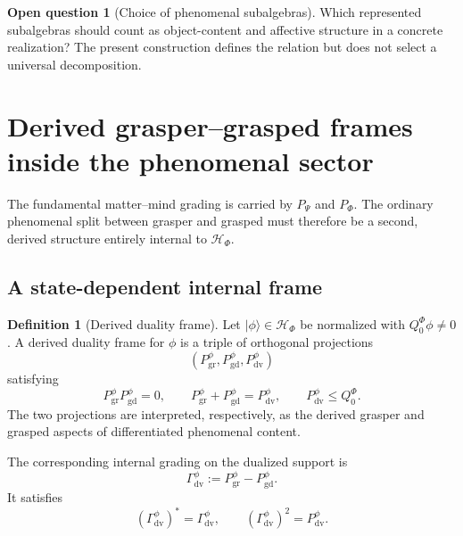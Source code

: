 \documentclass[11pt,reqno]{scrartcl}
\newcommand{\scrHF}{\mathscr H_{\Phi}}
\newcommand{\PP}{P_{\Psi}}
\newcommand{\PF}{P_{\Phi}}
\newcommand{\QzeroF}{Q_{0}^{\Phi}}
\newcommand{\ket}[1]{\lvert #1\rangle}
\newcommand{\Pdual}{P_{\mathrm{dv}}^{\phi}}
\newcommand{\Pgrasper}{P_{\mathrm{gr}}^{\phi}}
\newcommand{\Pgrasped}{P_{\mathrm{gd}}^{\phi}}
\newcommand{\Gammadual}{\Gamma_{\mathrm{dv}}^{\phi}}
\theoremstyle{plain}
\theoremstyle{definition}
\newtheorem{definition}[definition]{Definition}
\newtheorem{openquestion}[openquestion]{Open question}
\theoremstyle{remark}
\begin{document}
\begin{openquestion}[Choice of phenomenal subalgebras]
\label{q:content-affect-algebra-choice}
Which represented subalgebras should count as object-content and affective
structure in a concrete realization?  The present construction defines the
relation but does not select a universal decomposition.
\end{openquestion}
\section{Derived grasper--grasped frames inside the phenomenal sector}
\label{sec:derived-duality-frames}

The fundamental matter--mind grading is carried by $\PP$ and $\PF$.  The
ordinary phenomenal split between grasper and grasped must therefore be a
second, derived structure entirely internal to $\scrHF$.

\subsection{A state-dependent internal frame}

\begin{definition}[Derived duality frame]
\label{def:derived-duality-frame}
Let $\ket\phi\in\scrHF$ be normalized with
$\QzeroF\phi\neq0$.  A derived duality frame for $\phi$ is a triple of
orthogonal projections
\begin{equation}
  (\Pgrasper,\Pgrasped,\Pdual)
  \label{eq:duality-frame-triple}
\end{equation}
satisfying
\begin{equation}
  \Pgrasper\Pgrasped=0,
  \qquad
  \Pgrasper+\Pgrasped=\Pdual,
  \qquad
  \Pdual\leq\QzeroF.
  \label{eq:duality-frame-relations}
\end{equation}
The two projections are interpreted, respectively, as the derived grasper
and grasped aspects of differentiated phenomenal content.
\end{definition}

The corresponding internal grading on the dualized support is
\begin{equation}
  \boxed{
  \Gammadual
  :=\Pgrasper-\Pgrasped.}
  \label{eq:derived-duality-grading}
\end{equation}
It satisfies
\begin{equation}
  (\Gammadual)^* =\Gammadual,
  \qquad
  (\Gammadual)^2=\Pdual.
  \label{eq:derived-duality-grading-properties}
\end{equation}
\end{document}
